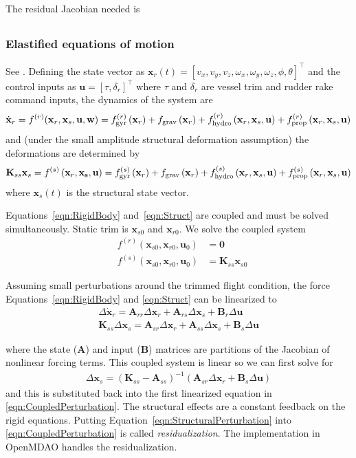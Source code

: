 \documentclass[10pt]{article}
\newcommand{\mbf}[1]{\mathbf{#1}}
\newcommand{\be}{\begin{eqnarray}}
\newcommand{\ee}{\end{eqnarray}}
\newcommand{\beq}{\begin{equation}
    \begin{aligned}
        }
\newcommand{\eeq}{\end{aligned}
\end{equation}
}
\newcommand{\tn}[1]{\textnormal{#1}}
\begin{document}
The residual Jacobian needed is
\be
\ee

\subsubsection{Elastified equations of motion}
See \citet[Sec. 5.3.2]{Palacios2023a}.
Defining the state vector as $\mbf{x}_r(t) = [v_x, v_y, v_z, \omega_x, \omega_y, \omega_z, \phi, \theta]^{\top}$ and the control inputs as $\mbf{u} = [\tau, \delta_r]^{\top}$ where $\tau$ and $\delta_r$ are vessel trim and rudder rake command inputs, the dynamics of the system are
\be
\label{eqn:RigidBody}
\dot{\mbf{x}}_r = f^{(r)}(\mbf{x}_r, \mbf{x}_s, \mbf{u}, \mbf{w})
=
f_{\tn{gyr}}^{(r)}\left(\mbf{x}_r\right) + f_{\tn{grav}} \left(\mbf{x}_r\right)
+ f_{\tn{hydro}}^{(r)}\left(\mbf{x}_r, \mbf{x}_s, \mbf{u}\right)
+ f_{\tn{prop}}^{(r)}\left(\mbf{x}_r, \mbf{x}_s, \mbf{u}\right)
\ee
and (under the small amplitude structural deformation assumption) the deformations are determined by
\be
\label{eqn:Struct}
\mbf{K}_{ss} \mbf{x}_s = f^{(s)}\left(\mbf{x}_r, \mbf{x_s}, \mbf{u}\right)
=
f_{\tn{gyr}}^{(s)}\left(\mbf{x}_r\right) + f_{\tn{grav}}\left(\mbf{x}_r\right)
+ f_{\tn{hydro}}^{(s)}\left(\mbf{x}_r, \mbf{x}_s, \mbf{u}\right)
+ f_{\tn{prop}}^{(s)}\left(\mbf{x}_r, \mbf{x}_s, \mbf{u}\right)
\ee
where $\mbf{x}_s(t)$ is the structural state vector.

Equations~\eqref{eqn:RigidBody} and~\eqref{eqn:Struct} are coupled and must be solved simultaneously.
Static trim is $\mbf{x}_{s0}$ and $\mbf{x}_{r0}$.
We solve the coupled system
\beq
& f^{(r)}\left( \mbf{x}_{s0}, \mbf{x}_{r0}, \mbf{u}_{0} \right) & = \mbf{0}
\\
& f^{(s)}\left( \mbf{x}_{s0}, \mbf{x}_{r0}, \mbf{u}_{0} \right)
&=
\mbf{K}_{ss} \mbf{x}_{s0}
\eeq

Assuming small perturbations around the trimmed flight condition, the force Equations~\eqref{eqn:RigidBody} and \eqref{eqn:Struct} can be linearized to
% 
\beq
\label{eqn:CoupledPerturbation}
\Delta \dot{\mbf{x}}_r = \mbf{A}_{rr} \Delta \mbf{x}_r
+ \mbf{A}_{rs} \Delta \mbf{x}_s
+ \mbf{B}_{r} \Delta \mbf{u}
\\
\mbf{K}_{ss} \Delta {\mbf{x}}_s =
\mbf{A}_{sr} \Delta \mbf{x}_r
+ \mbf{A}_{ss} \Delta \mbf{x}_s
+ \mbf{B}_{s} \Delta \mbf{u}
\eeq
% 
where the state ($\mbf{A}$) and input ($\mbf{B}$) matrices are partitions of the Jacobian of nonlinear forcing terms.
This coupled system is linear so we can first solve for
\be
\label{eqn:StructuralPerturbation}
\Delta \mbf{x}_s = \left(\mbf{K}_{ss} - \mbf{A}_{ss}\right)^{-1} \left(\mbf{A}_{sr} \Delta \mbf{x}_r + \mbf{B}_s \Delta \mbf{u} \right)
\ee
and this is substituted back into the first linearized equation in \eqref{eqn:CoupledPerturbation}.
The structural effects are a constant feedback on the rigid equations.
Putting Equation~\eqref{eqn:StructuralPerturbation} into \eqref{eqn:CoupledPerturbation} is called \emph{residualization}.
The implementation in OpenMDAO handles the residualization.
\end{document}

